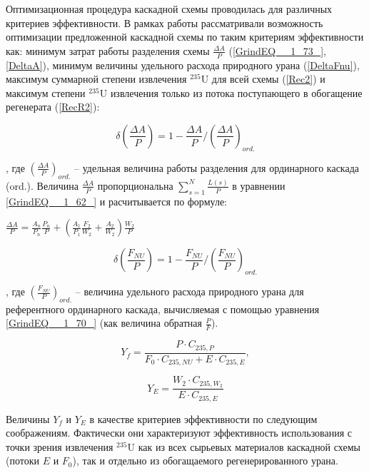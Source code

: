 Оптимизационная процедура каскадной схемы проводилась для различных критериев эффективности. В рамках работы рассматривали возможность оптимизации предложенной каскадной схемы по таким критериям эффективности как: минимум затрат работы разделения схемы $\frac{\Delta A}{P}$ (\ref{GrindEQ__1_73_}, \ref{DeltaA}), минимум величины удельного расхода природного урана (\ref{DeltaFnu}), максимум суммарной степени извлечения $^{235}$U для всей схемы (\ref{Rec2}) и максимум степени $^{235}$U извлечения только из потока поступающего в обогащение регенерата (\ref{RecR2}):

\begin{equation} \label{DeltaA} 
    \delta(\frac{\Delta A}{P})=1-\frac{\Delta A}{P}/(\frac{\Delta A}{P})_{ord.}
\end{equation}

, где $(\frac{\Delta A}{P})_{ord.}$ -- удельная величина работы разделения для ординарного каскада (ord.). Величина $\frac{\Delta A}{P}$ пропорциональна $\sum _{s=1}^{N}\frac{L(s)}{P}$ в уравнении \ref{GrindEQ__1_62_} и расчитывается по формуле:

$\frac{\Delta A}{P} = \frac{A_n}{P_n} \frac{P_n}{P}+\left(\frac{A_1}{P_1} \frac{F_2}{W_2}+\frac{A_2}{W_2}\right) \frac{W_2}{P}$

\begin{equation} \label{DeltaFnu} 
\delta(\frac{F_{NU}}{P})=1-\frac{F_{NU}}{P}/(\frac{F_{NU}}{P})_{ord.}
\end{equation} 

, где $(\frac{F_{NU}}{P})_{ord.}$ -- величина удельного расхода природного урана для референтного ординарного каскада, вычисляемая с помощью уравнения \ref{GrindEQ__1_70_} (как величина обратная $\frac{P}{F}$).

\begin{equation} \label{Rec2} 
    Y_f = \frac{P \cdot C_{235,P}}{F_0 \cdot C_{235,NU} + E \cdot C_{235,E}}, 
\end{equation} 

\begin{equation} \label{RecR2} 
    Y_{E} = \frac{W_2\cdot C_{235,W_2}}{E \cdot C_{235,E}}        
\end{equation} 

Величины $Y_f$ и $Y_{E}$ в качестве критериев эффективности по следующим соображениям. Фактически они характеризуют эффективность использования с точки зрения извлечения $^{235}$U как из всех сырьевых материалов каскадной схемы (потоки $E$ и $F_0$), так и отдельно из обогащаемого регенерированного урана.

